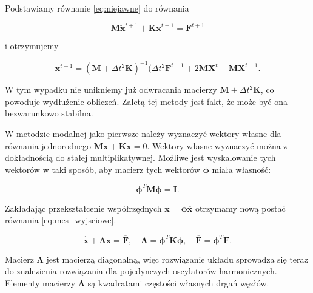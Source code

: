 Podstawiamy równanie \ref{eq:niejawne} do równania

\begin{equation} \label{eq:mes_wyjsciowe}
	\textbf{M} \ddot{\textbf{x}}^{t+1} + \textbf{Kx}^{t+1} = \textbf{F}^{t+1}
\end{equation}

i otrzymujemy 

\begin{equation} 
	\textbf{x}^{t+1} = (\textbf{M} + \Delta t^2 \textbf{K})^{-1} (\Delta t^2 \textbf{F}^{t+1} + 2\textbf{MX}^t - \textbf{MX}^{t-1}.
\end{equation}

W tym wypadku nie unikniemy już odwracania macierzy \( \textbf{M} + \Delta t^2 \textbf{K} \), co powoduje wydłużenie obliczeń. Zaletą tej metody jest fakt, że może być ona bezwarunkowo stabilna.

W metodzie modalnej jako pierwsze należy wyznaczyć wektory własne dla równania jednorodnego \( \textbf{M} \ddot{\textbf{x}} + \textbf{Kx} = 0 \). Wektory własne wyznaczyć można z dokładnością do stałej multiplikatywnej. Możliwe jest wyskalowanie tych wektorów w taki sposób, aby macierz tych wektorów \( \boldsymbol{\phi} \) miała własność:

\begin{equation} 
	\boldsymbol{\phi}^T \textbf{M} \boldsymbol{\phi} = \textbf{I}.
\end{equation}

Zakładając przekształcenie współrzędnych \( \textbf{x} = \boldsymbol{\phi} \overbar{\textbf{x}}  \) otrzymamy nową postać równania \ref{eq:mes_wyjsciowe}.

\begin{equation} 
	\ddot{\overbar{\textbf{x}}} + \boldsymbol{\Lambda} \overbar{\textbf{x}} = \overbar{\textbf{F}}, \quad \boldsymbol{\Lambda} = \boldsymbol{\phi}^T\textbf{K}\boldsymbol{\phi}, \quad \overbar{\textbf{F}} = \boldsymbol{\phi}^T \textbf{F}.
\end{equation}

Macierz \( \boldsymbol{\Lambda} \) jest macierzą diagonalną, więc rozwiązanie układu sprowadza się teraz do znalezienia rozwiązania dla pojedynczych oscylatorów harmonicznych. Elementy macierzy \( \boldsymbol{\Lambda} \) są kwadratami częstości własnych drgań węzłów.

